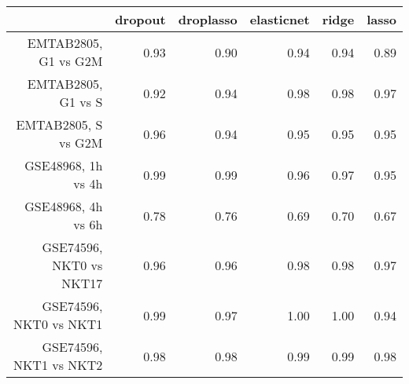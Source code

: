 \begin{table}[ht]
\centering
\begin{tabular}{rrrrrr}
  \hline
 & dropout & droplasso & elasticnet & ridge & lasso \\ 
  \hline
EMTAB2805, G1 vs G2M & 0.93 & 0.90 & 0.94 & 0.94 & 0.89 \\ 
  EMTAB2805, G1 vs S & 0.92 & 0.94 & 0.98 & 0.98 & 0.97 \\ 
  EMTAB2805, S vs G2M & 0.96 & 0.94 & 0.95 & 0.95 & 0.95 \\ 
  GSE48968, 1h vs 4h & 0.99 & 0.99 & 0.96 & 0.97 & 0.95 \\ 
  GSE48968, 4h vs 6h & 0.78 & 0.76 & 0.69 & 0.70 & 0.67 \\ 
  GSE74596, NKT0 vs NKT17 & 0.96 & 0.96 & 0.98 & 0.98 & 0.97 \\ 
  GSE74596, NKT0 vs NKT1 & 0.99 & 0.97 & 1.00 & 1.00 & 0.94 \\ 
  GSE74596, NKT1 vs NKT2 & 0.98 & 0.98 & 0.99 & 0.99 & 0.98 \\ 
   \hline
\end{tabular}
\end{table}
